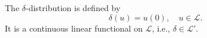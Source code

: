 The $\delta$-distribution is defined by
$$\delta(u) = u(0), \quad u \in \mathcal{L}.$$
It is a continuous linear functional on $\mathcal{L}$, i.e., $\delta \in \mathcal{L}'$.
